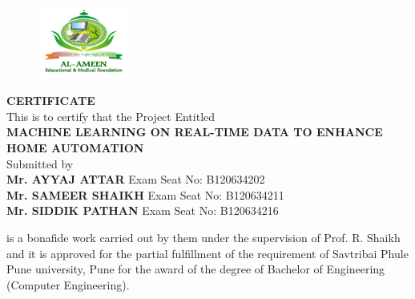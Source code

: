 \newpage
\thispagestyle{empty}


\begin{center}

\begin{figure}
	\centering
	\includegraphics[width=0.27\textwidth]{./InitialPages/al_ameen-logo}
\end{figure}

\textbf{CERTIFICATE}\\[\baselineskip]
This is to certify that the Project Entitled\\[\baselineskip]
\textbf{MACHINE LEARNING ON REAL-TIME DATA TO ENHANCE HOME AUTOMATION}\\[\baselineskip]
Submitted by\\[\baselineskip]
\textbf{Mr. AYYAJ ATTAR} Exam Seat No: B120634202\\
\textbf{Mr. SAMEER SHAIKH} Exam Seat No: B120634211\\
\textbf{Mr. SIDDIK PATHAN} Exam Seat No: B120634216\\[\baselineskip]
\end{center}
is a bonafide work carried out by them under the supervision of Prof. R. Shaikh and it is approved for the partial fulfillment of the requirement of Savtribai Phule Pune university, Pune for the award of the degree of Bachelor of Engineering (Computer Engineering).
\\[1.0cm]

